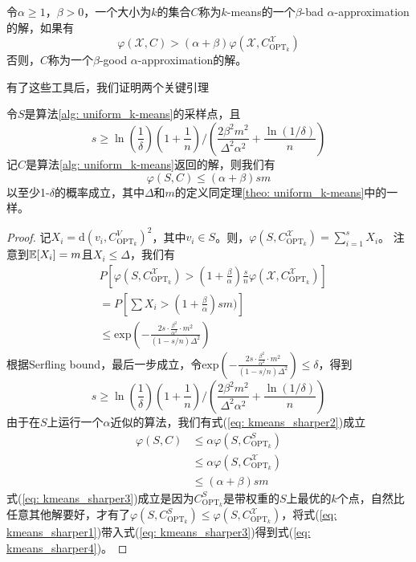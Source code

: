 \begin{definition}[$k$-means问题解的质量2]
    令$\alpha \geq 1$，$\beta > 0$，一个大小为$k$的集合$C$称为$k$-means的一个$\beta$-bad $\alpha$-approximation的解，如果有
    \begin{equation}
    \varphi(\mathcal{X},C) > (\alpha + \beta)\varphi(\mathcal{X},C_{\text{OPT}_k}^\mathcal{X})
    \end{equation}
    否则，$C$称为一个$\beta$-good $\alpha$-approximation的解。
\end{definition}
有了这些工具后，我们证明两个关键引理
\begin{lemma}
    \label{lem: S->C}
    令$S$是算法\ref{alg: uniform_k-means}的采样点，且
    \begin{equation}
    s \geq \ln(\frac{1}{\delta})(1+\frac{1}{n})/(\frac{2\beta^2 m^2}{\Delta^2 \alpha^2}+\frac{\ln(1/\delta)}{n})
    \end{equation}
    记$C$是算法\ref{alg: uniform_k-means}返回的解，则我们有
    \begin{equation}
    \varphi(S,C) \leq (\alpha + \beta)sm
    \end{equation}
    以至少1-$\delta$的概率成立，其中$\Delta$和$m$的定义同定理\ref{theo: uniform_k-means}中的一样。
\end{lemma}
\begin{proof}
    记$X_i = \text{d}(v_i,C_{\text{OPT}_k}^{V})^2$，其中$v_i \in S$。则，$\varphi(S,C_{\text{OPT}_k}^{\mathcal{X}}) = \sum_{i=1}^s X_i$。 注意到$\mathbb{E}[X_i] = m$且$X_i \leq \Delta$，我们有
    \begin{align}
    & P[\varphi(S,C_{\text{OPT}_k}^\mathcal{X}) > (1+\frac{\beta}{\alpha})\frac{s}{n}\varphi(\mathcal{X},C_{\text{OPT}_k}^\mathcal{X})] \label{eq: kmeans_sharper1} \\
    &= P[\sum X_{i}>(1+\frac{\beta}{\alpha}) s m)] \\
    &\leq \text{exp}(-\frac{2 s \cdot \frac{\beta^2}{\alpha^2} \cdot m^2}{(1-s / n) \Delta^2})
    \end{align}
    根据Serfling bound，最后一步成立，令$\text{exp}(-\frac{2 s \cdot \frac{\beta^2}{\alpha^2} \cdot m^2}{(1-s / n) \Delta^2}) \leq \delta$，得到
    \begin{equation}
    s \geq \ln(\frac{1}{\delta})(1+\frac{1}{n})/(\frac{2\beta^2 m^2}{\Delta^2 \alpha^2}+\frac{\ln(1/\delta)}{n})
    \end{equation}
    由于在$S$上运行一个$\alpha$近似的算法，我们有式(\ref{eq: kmeans_sharper2})成立
    \begin{align}
    \varphi(S,C) &\leq \alpha\varphi(S,C_{\text{OPT}_k}^S) \label{eq: kmeans_sharper2} \\
    &\leq \alpha\varphi(S,C_{\text{OPT}_k}^{\mathcal{X}}) \label{eq: kmeans_sharper3} \\
    &\leq (\alpha + \beta)sm \label{eq: kmeans_sharper4}
    \end{align}
    式(\ref{eq: kmeans_sharper3})成立是因为$C_{\text{OPT}_k}^S$是带权重的$S$上最优的$k$个点，自然比任意其他解要好，才有了$\varphi(S,C_{\text{OPT}_k}^S) \leq \varphi(S,C_{\text{OPT}_k}^\mathcal{X})$，将式(\ref{eq: kmeans_sharper1})带入式(\ref{eq: kmeans_sharper3})得到式(\ref{eq: kmeans_sharper4})。
\end{proof}
